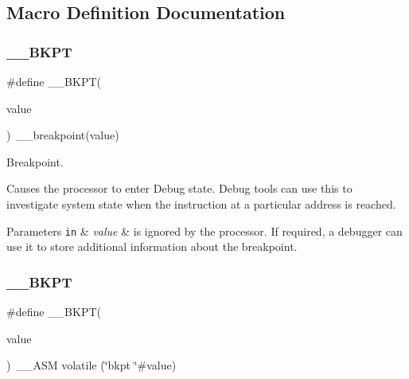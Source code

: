 \subsection{Macro Definition Documentation}
\mbox{\label{group___c_m_s_i_s___core___instruction_interface_ga15ea6bd3c507d3e81c3b3a1258e46397}} 
\subsubsection{\texorpdfstring{\+\_\+\+\_\+\+B\+K\+PT}{\_\_BKPT}\hspace{0.1cm}{\footnotesize\ttfamily [1/3]}}
{\footnotesize\ttfamily \#define \+\_\+\+\_\+\+B\+K\+PT(\begin{DoxyParamCaption}\item[{}]{value }\end{DoxyParamCaption})~\+\_\+\+\_\+breakpoint(value)}



Breakpoint. 

Causes the processor to enter Debug state. Debug tools can use this to investigate system state when the instruction at a particular address is reached. 
\begin{DoxyParams}[1]{Parameters}
\mbox{\tt in}  & {\em value} & is ignored by the processor. If required, a debugger can use it to store additional information about the breakpoint. \\
\hline
\end{DoxyParams}
\mbox{\label{group___c_m_s_i_s___core___instruction_interface_ga15ea6bd3c507d3e81c3b3a1258e46397}} 
\subsubsection{\texorpdfstring{\+\_\+\+\_\+\+B\+K\+PT}{\_\_BKPT}\hspace{0.1cm}{\footnotesize\ttfamily [2/3]}}
{\footnotesize\ttfamily \#define \+\_\+\+\_\+\+B\+K\+PT(\begin{DoxyParamCaption}\item[{}]{value }\end{DoxyParamCaption})~\+\_\+\+\_\+\+A\+SM volatile (\char`\"{}bkpt \char`\"{}\#value)}



